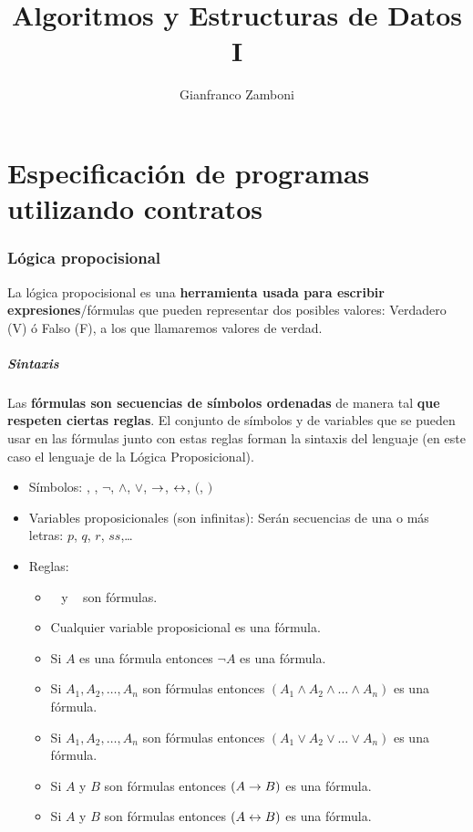 

\title{Algoritmos y Estructuras de Datos I}
\author{Gianfranco Zamboni}







	\maketitle
	\tableofcontents
	\newpage

	\part{Especificación de programas utilizando contratos}
\section{Lógica propocisional}
La lógica propocisional es una \textbf{herramienta usada para escribir expresiones}/fórmulas que pueden representar dos posibles valores: Verdadero (V) ó Falso (F), a los que llamaremos valores de verdad.

\subsubsection*{Sintaxis}
Las \textbf{fórmulas son secuencias de símbolos ordenadas} de manera tal\textbf{ que respeten ciertas reglas}. El conjunto de símbolos y de variables que se pueden usar en las fórmulas junto con estas reglas forman la sintaxis del lenguaje (en este caso el lenguaje de la Lógica Proposicional).

\begin{itemize}
	\item Símbolos: \True, \False, $\lnot$, $\land$, $\lor$, $\rightarrow$, $\leftrightarrow$, $($, $)$
	\item Variables proposicionales (son infinitas): Serán secuencias de una o más letras: $p$, $q$, $r$, $ss$,\dots
	\item Reglas:
	\begin{itemize}
		\item \True~ y \False~ son fórmulas.
		\item Cualquier variable proposicional es una fórmula.
		\item Si $A$ es una fórmula entonces $\lnot A$ es una fórmula.
		\item Si $A_1,A_2,\dots,A_n$ son fórmulas entonces $(A_1\land A_2 \land \dots\land A_n)$ es una fórmula.
		\item Si $A_1,A_2,\dots,A_n$ son fórmulas entonces $(A_1\lor A_2 \lor \dots\lor A_n)$ es una fórmula.
		\item Si $A$ y $B$ son fórmulas entonces $(A\rightarrow B)$ es una fórmula.
		\item Si $A$ y $B$ son fórmulas entonces $(A\leftrightarrow B)$ es una fórmula.
	\end{itemize}
\end{itemize}

